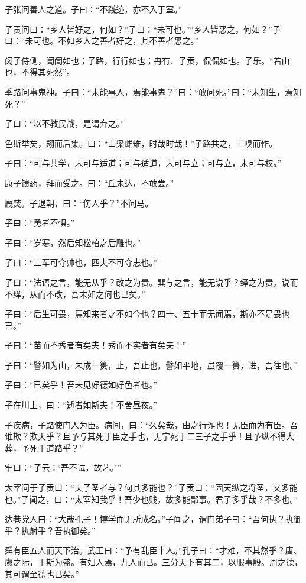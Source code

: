 \documentclass[a5paper]{ctexbook}
\begin{document}
    子张问善人之道。子曰：“不践迹，亦不入于室。”

    子贡问曰：“乡人皆好之，何如？”子曰：“未可也。”“乡人皆恶之，何如？”子曰：“未可也。不如乡人之善者好之，其不善者恶之。”

    闵子侍侧，訚訚如也；子路，行行如也；冉有、子贡，侃侃如也。子乐。“若由也，不得其死然”。

    季路问事鬼神。子曰：“未能事人，焉能事鬼？”曰：“敢问死。”曰：“未知生，焉知死？”

    子曰：“以不教民战，是谓弃之。”

    色斯举矣，翔而后集。曰：“山梁雌雉，时哉时哉！”子路共之，三嗅而作。

    子曰：“可与共学，未可与适道；可与适道，未可与立；可与立，未可与权。”

    康子馈药，拜而受之。曰：“丘未达，不敢尝。”
    
    厩焚。子退朝，曰：“伤人乎？”不问马。

    子曰：“勇者不惧。”

    子曰：“岁寒，然后知松柏之后雕也。”

    子曰：“三军可夺帅也，匹夫不可夺志也。”

    子曰：“法语之言，能无从乎？改之为贵。巽与之言，能无说乎？绎之为贵。说而不绎，从而不改，吾末如之何也已矣。”

    子曰：“后生可畏，焉知来者之不如今也？四十、五十而无闻焉，斯亦不足畏也已。”

    子曰：“苗而不秀者有矣夫！秀而不实者有矣夫！”

    子曰：“譬如为山，未成一篑，止，吾止也。譬如平地，虽覆一篑，进，吾往也。”

    子曰：“已矣乎！吾未见好德如好色者也。”

    子在川上，曰：“逝者如斯夫！不舍昼夜。”

    子疾病，子路使门人为臣。病间，曰：“久矣哉，由之行诈也！无臣而为有臣。吾谁欺？欺天乎？且予与其死于臣之手也，无宁死于二三子之手乎！且予纵不得大葬，予死于道路乎？”

    牢曰：“子云：‘吾不试，故艺。’”

    太宰问于子贡曰：“夫子圣者与？何其多能也？”子贡曰：“固天纵之将圣，又多能也。”子闻之，曰：“太宰知我乎！吾少也贱，故多能鄙事。君子多乎哉？不多也。”

    达巷党人曰：“大哉孔子！博学而无所成名。”子闻之，谓门弟子曰：“吾何执？执御乎？执射乎？吾执御矣。”

    舜有臣五人而天下治。武王曰：“予有乱臣十人。”孔子曰：“才难，不其然乎？唐、虞之际，于斯为盛。有妇人焉，九人而已。三分天下有其二，以服事殷。周之德，其可谓至德也已矣。”
\end{document}
